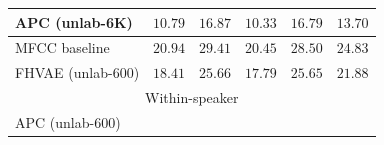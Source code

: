 \documentclass[transmag]{IEEEtran}
\begin{document}
\begin{table}[!t]
{\begin{tabular}{l|cccc|c}

APC (unlab-6K) &$10.79$&$16.87$&$10.33$&$16.79$&$\bm{13.70}$\\
\midrule
MFCC baseline \cite{kahn2019librilight}  & $20.94$&	$29.41$&	$20.45$&	$28.50$&	$24.83$\\
FHVAE (unlab-600)  &$18.41$&$25.66$&$17.79$&$25.65$&$21.88$\\

\midrule
 \multicolumn{6}{c}{Within-speaker} \\
\midrule
APC (unlab-600) \cite{feng2020unsupervised}  &



\end{tabular}}
\end{table}
\end{document}
